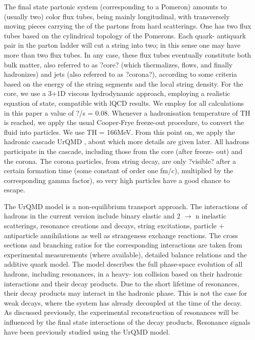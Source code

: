 The final state partonic system (corresponding to a Pomeron) amounts to (usually two) color flux tubes, being mainly longitudinal, with transversely moving pieces carrying the \pt of the partons from hard scatterings. One has two flux tubes based on the cylindrical topology of the Pomerons. Each quark- antiquark pair in the parton ladder will cut a string into two; in this sense one may have more than two flux tubes. In any case, these flux tubes eventually constitute both bulk matter, also referred to as ?core? (which thermalizes, flows, and finally hadronizes) and jets (also referred to as ?corona?), according to some criteria based on the energy of the string segments and the local string density. For the core, we use a 3+1D viscous hydrodynamic approach, employing a realistic equation of state, compatible with lQCD results. We employ for all calculations in this paper a value of ?/s = 0.08. Whenever a hadronisation temperature of TH is reached, we apply the usual Cooper-Frye freeze-out procedure, to convert the fluid into particles. We use TH = 166MeV. From this point on, we apply the hadronic cascade UrQMD \cite{cite:URQMDa, cite:URQMDb}, about which more details are given later. All hadrons participate in the cascade, including those from the core (after freeze- out) and the corona. The corona particles, from string decay, are only ?visible? after a certain formation time (some constant of order one fm/c), multiplied by the corresponding gamma factor), so very high \pt particles have a good chance to escape.

The UrQMD model is a non-equilibrium transport approach. The interactions of hadrons in the current version include binary elastic and 2 $\rightarrow$ n inelastic scatterings, resonance creations and decays, string excitations, particle + antiparticle annihilations as well as strangeness exchange reactions. The cross sections and branching ratios for the corresponding interactions are taken from experimental measurements (where available), detailed balance relations and the additive quark model. The model describes the full phase-space evolution of all hadrons, including resonances, in a heavy- ion collision based on their hadronic interactions and their decay products. Due to the short lifetime of resonances, their decay products may interact in the hadronic phase. This is not the case for weak decays, where the system has already decoupled at the time of the decay. As discussed previously, the experimental reconstruction of resonances will be influenced by the final state interactions of the decay products. Resonance signals have been previously studied using the UrQMD model. 


\newpage